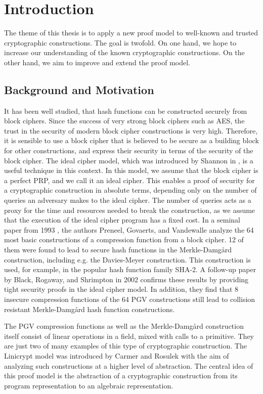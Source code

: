 \chapter{Introduction}
\renewcommand{\MD}{Merkle-Damg\aa rd }
 
The theme of this thesis is to apply a new proof model to well-known and trusted cryptographic constructions.
The goal is twofold.
On one hand, we hope to increase our understanding of the known cryptographic constructions.
On the other hand, we aim to improve and extend the proof model.

\section{Background and Motivation}

It has been well studied, that hash functions can be constructed securely from block ciphers.
Since the success of very strong block ciphers such as AES, 
the trust in the security of modern block cipher constructions is very high.
Therefore, it is sensible to use a block cipher that is believed to be secure as a building block for other constructions,
and express their security in terms of the security of the block cipher.
The ideal cipher model, which was introduced by Shannon in \cite{Shannon49},
is a useful technique in this context.
In this model, we assume that the block cipher is a perfect PRP, and we call it an ideal cipher.
This enables a proof of security for a cryptographic construction in absolute terms,
depending only on the number of queries an adversary makes to the ideal cipher.
The number of queries acts as a proxy for the time and resources needed to break the construction,
as we assume that the execution of the ideal cipher program has a fixed cost.
In a seminal paper from 1993 \cite{C:PreGovVan93}, the authors Preneel, Govaerts, and Vandewalle analyze the 64 most basic constructions of a compression function from a block cipher.
12 of them were found to lead to secure hash functions in the \MD construction, including e.g. the Davies-Meyer construction.
This construction is used, for example, in the popular hash function family SHA-2.
A follow-up paper by Black, Rogaway, and Shrimpton \cite{C:BlaRogShr02} in 2002 confirms these results
by providing tight security proofs in the ideal cipher model.
In addition, 
they find that 8 insecure compression functions of the 64 PGV constructions still lead to collision resistant \MD hash function constructions.

The PGV compression functions as well as the \MD construction itself consist of linear operations in a field,
mixed with calls to a primitive.
They are just two of many examples of this type of cryptographic construction.
The Linicrypt model was introduced by Carmer and Rosulek \cite{C:CarRos16}
with the aim of analyzing such constructions at a higher level of abstraction.
The central idea of this proof model is the abstraction of a cryptographic construction from its program representation to an algebraic representation.

